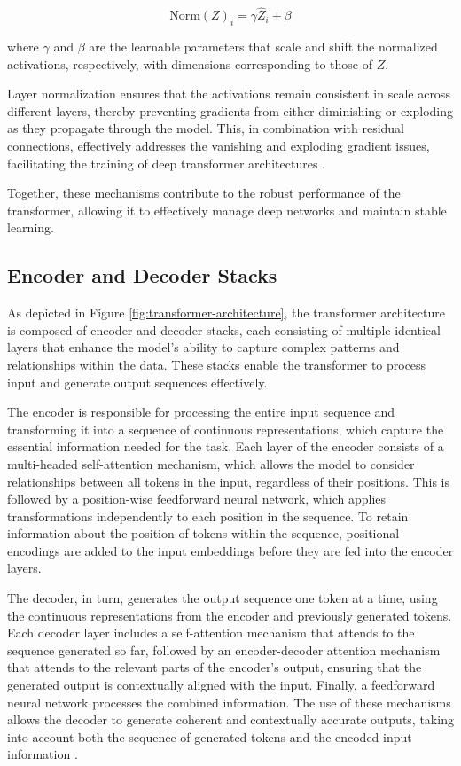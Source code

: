 \begin{equation}
\text{Norm}(Z)_i = \gamma \hat{Z}_i + \beta
\end{equation}

where \( \gamma \) and \( \beta \) are the learnable parameters that scale and shift the normalized activations, respectively, with dimensions corresponding to those of \( Z \).

Layer normalization ensures that the activations remain consistent in scale across different layers, thereby preventing gradients from either diminishing or exploding as they propagate through the model. This, in combination with residual connections, effectively addresses the vanishing and exploding gradient issues, facilitating the training of deep transformer architectures \cite{vaswani2017attention, ba2016layer}.

Together, these mechanisms contribute to the robust performance of the transformer, allowing it to effectively manage deep networks and maintain stable learning.

\subsection{Encoder and Decoder Stacks}

As depicted in Figure \ref{fig:transformer-architecture}, the transformer architecture is composed of encoder and decoder stacks, each consisting of multiple identical layers that enhance the model’s ability to capture complex patterns and relationships within the data. These stacks enable the transformer to process input and generate output sequences effectively.

The encoder is responsible for processing the entire input sequence and transforming it into a sequence of continuous representations, which capture the essential information needed for the task. Each layer of the encoder consists of a multi-headed self-attention mechanism, which allows the model to consider relationships between all tokens in the input, regardless of their positions. This is followed by a position-wise feedforward neural network, which applies transformations independently to each position in the sequence. To retain information about the position of tokens within the sequence, positional encodings are added to the input embeddings before they are fed into the encoder layers.

The decoder, in turn, generates the output sequence one token at a time, using the continuous representations from the encoder and previously generated tokens. Each decoder layer includes a self-attention mechanism that attends to the sequence generated so far, followed by an encoder-decoder attention mechanism that attends to the relevant parts of the encoder’s output, ensuring that the generated output is contextually aligned with the input. Finally, a feedforward neural network processes the combined information. The use of these mechanisms allows the decoder to generate coherent and contextually accurate outputs, taking into account both the sequence of generated tokens and the encoded input information \cite{vaswani2017attention}.

